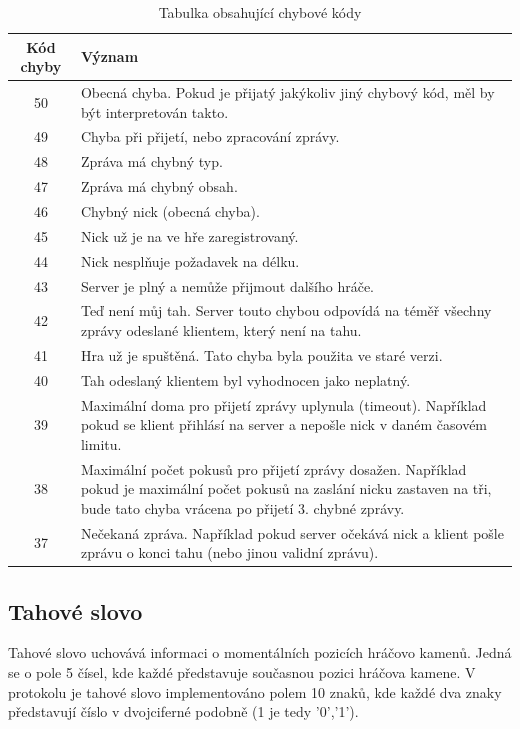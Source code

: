 \documentclass[11pt,a4paper]{scrartcl}
\begin{document}
\begin{center}
		\begin{longtable} {| c | p{12cm} | }
			\caption{Tabulka obsahující chybové kódy} \\
			
			\hline
			Kód chyby & Význam \\
			\hline
			\hline
			50 & Obecná chyba. Pokud je přijatý jakýkoliv jiný chybový kód, měl by být interpretován takto.\\
			\hline
			49 & Chyba při přijetí, nebo zpracování zprávy.\\
			\hline
			48 & Zpráva má chybný typ.\\
			\hline
			47 & Zpráva má chybný obsah. \\
			\hline
			46 & Chybný nick (obecná chyba).\\
			\hline
			45 & Nick už je na ve hře zaregistrovaný.\\
			\hline
			44 & Nick nesplňuje požadavek na délku.\\
			\hline
			43 & Server je plný a nemůže přijmout dalšího hráče.\\
			\hline
			42 & Teď není můj tah. Server touto chybou odpovídá na téměř všechny zprávy odeslané klientem, který není na tahu.\\
			\hline
			41 & Hra už je spuštěná. Tato chyba byla použita ve staré verzi.\\
			\hline
			40 & Tah odeslaný klientem byl vyhodnocen jako neplatný.\\
			\hline
			39 & Maximální doma pro přijetí zprávy uplynula (timeout). Například pokud se klient přihlásí na server a nepošle nick v daném časovém limitu.\\
			\hline
			38 & Maximální počet pokusů pro přijetí zprávy dosažen. Například pokud je maximální počet pokusů na zaslání nicku zastaven na tři, bude tato chyba vrácena po přijetí 3. chybné zprávy.\\
			\hline
			37 & Nečekaná zpráva. Například pokud server očekává nick a klient pošle zprávu o konci tahu (nebo jinou validní zprávu).\\
			\hline
		\end{longtable}
	\end{center}


	\subsection{Tahové slovo}
	Tahové slovo uchovává informaci o momentálních pozicích hráčovo kamenů. Jedná se o pole 5 čísel, kde každé představuje současnou pozici hráčova kamene. V protokolu je tahové slovo implementováno polem 10 znaků, kde každé dva znaky představují číslo v dvojciferné podobně (1 je tedy '0','1').
	
\end{document}

